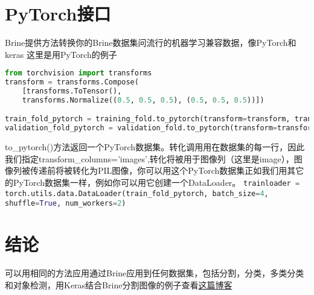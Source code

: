 \documentclass{article}
\begin{document}
\section{PyTorch接口}
Brine提供方法转换你的Brine数据集问流行的机器学习兼容数据，像PyTorch和keras
这里是用PyTorch的例子
\begin{lstlisting}[language=Python]
from torchvision import transforms
transform = transforms.Compose(
    [transforms.ToTensor(),
    transforms.Normalize((0.5, 0.5, 0.5), (0.5, 0.5, 0.5))])

train_fold_pytorch = training_fold.to_pytorch(transform=transform, transform_columns='images')
validation_fold_pytorch = validation_fold.to_pytorch(transform=transform, transform_columns='images')
\end{lstlisting}
to\_pytorch()方法返回一个PyTorch数据集。转化调用用在数据集的每一行，因此我们指定transform\_columns='images',转化将被用于图像列（这里是image），图像列被传递前将被转化为PIL图像，你可以用这个PyTorch数据集正如我们用其它的PyTorch数据集一样，例如你可以用它创建一个DataLoader。
\lstinline[language=Python]{trainloader = torch.utils.data.DataLoader(train_fold_pytorch, batch_size=4, shuffle=True, num_workers=2)}
\section{结论}
可以用相同的方法应用通过Brine应用到任何数据集，包括分割，分类，多类分类和对象检测，用Keras结合Brine分割图像的例子查看\href{https://medium.com/@hanrelan/a-non-experts-guide-to-image-segmentation-using-deep-neural-nets-dda5022f6282}{这篇博客}
\end{document}
